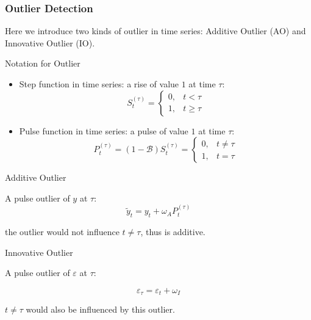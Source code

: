     

\subsubsection{Outlier Detection}
    Here we introduce two kinds of outlier in time series: Additive Outlier (AO) and Innovative Outlier (IO).
    
\begin{point}
    Notation for Outlier
\end{point}

\begin{itemize}[topsep=2pt,itemsep=0pt]
    \item Step function in time series: a rise of value $ 1 $ at time $ \tau $:
    \[
         S_t^{(\tau)}=\begin{cases}
             0,& t<\tau\\
             1,& t\geq \tau
         \end{cases}
    \]
    \item Pulse function in time series: a pulse of value $ 1 $ at time $ \tau $:
    \[
        P_t^{(\tau)}=(1-\mathscr{B} ) S_t^{(\tau)}=\begin{cases}
            0,&t\neq \tau\\
            1,&t=\tau
        \end{cases}
    \]

    
\end{itemize}

    

\begin{point}
    Additive Outlier
\end{point}

    A pulse outlier of $ y $ at $ \tau $:
    \[
        \tilde{y}_t=y_t+\omega _A P_t^{(\tau)} 
    \]

    the outlier would not influence $ t\neq \tau $, thus is additive.

\begin{point}
    Innovative Outlier
\end{point}

    A pulse outlier of $ \varepsilon  $ at $ \tau $:
    
    \[
        \varepsilon _\tau =\varepsilon _t+\omega _I 
    \]

    $ t\neq \tau $ would also be influenced by this outlier.
    
    
    

